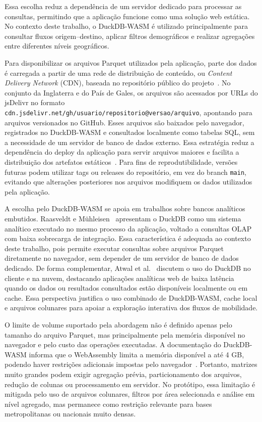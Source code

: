 \documentclass[12pt]{article}
\begin{document}
Essa escolha reduz a dependência de um servidor dedicado para processar as consultas, permitindo que a aplicação funcione como uma solução web estática. No contexto deste trabalho, o DuckDB-WASM é utilizado principalmente para consultar fluxos origem--destino, aplicar filtros demográficos e realizar agregações entre diferentes níveis geográficos.

Para disponibilizar os arquivos Parquet utilizados pela aplicação, parte dos dados é carregada a partir de uma rede de distribuição de conteúdo, ou \textit{Content Delivery Network} (CDN), baseada no repositório público do projeto~\cite{projectGithub}. No conjunto da Inglaterra e do País de Gales, os arquivos são acessados por URLs do jsDelivr no formato \texttt{cdn.jsdelivr.net/gh/usuario/repositorio@versao/arquivo}, apontando para arquivos versionados no GitHub. Esses arquivos são baixados pelo navegador, registrados no DuckDB-WASM e consultados localmente como tabelas SQL, sem a necessidade de um servidor de banco de dados externo. Essa estratégia reduz a dependência do deploy da aplicação para servir arquivos maiores e facilita a distribuição dos artefatos estáticos~\cite{jsdelivrGithub}. Para fins de reprodutibilidade, versões futuras podem utilizar tags ou releases do repositório, em vez do branch \texttt{main}, evitando que alterações posteriores nos arquivos modifiquem os dados utilizados pela aplicação.

A escolha pelo DuckDB-WASM se apoia em trabalhos sobre bancos analíticos embutidos. Raasveldt e Mühleisen~\cite{raasveldt2019duckdb} apresentam o DuckDB como um sistema analítico executado no mesmo processo da aplicação, voltado a consultas OLAP com baixa sobrecarga de integração. Essa característica é adequada ao contexto deste trabalho, pois permite executar consultas sobre arquivos Parquet diretamente no navegador, sem depender de um servidor de banco de dados dedicado. De forma complementar, Atwal et al.~\cite{atwal2024motherduck} discutem o uso do DuckDB no cliente e na nuvem, destacando aplicações analíticas web de baixa latência quando os dados ou resultados consultados estão disponíveis localmente ou em cache. Essa perspectiva justifica o uso combinado de DuckDB-WASM, cache local e arquivos colunares para apoiar a exploração interativa dos fluxos de mobilidade.

O limite de volume suportado pela abordagem não é definido apenas pelo tamanho do arquivo Parquet, mas principalmente pela memória disponível no navegador e pelo custo das operações executadas. A documentação do DuckDB-WASM informa que o WebAssembly limita a memória disponível a até 4 GB, podendo haver restrições adicionais impostas pelo navegador~\cite{duckdbWasmDocs}. Portanto, matrizes muito grandes podem exigir agregação prévia, particionamento dos arquivos, redução de colunas ou processamento em servidor. No protótipo, essa limitação é mitigada pelo uso de arquivos colunares, filtros por área selecionada e análise em nível agregado, mas permanece como restrição relevante para bases metropolitanas ou nacionais muito densas.
\end{document}
